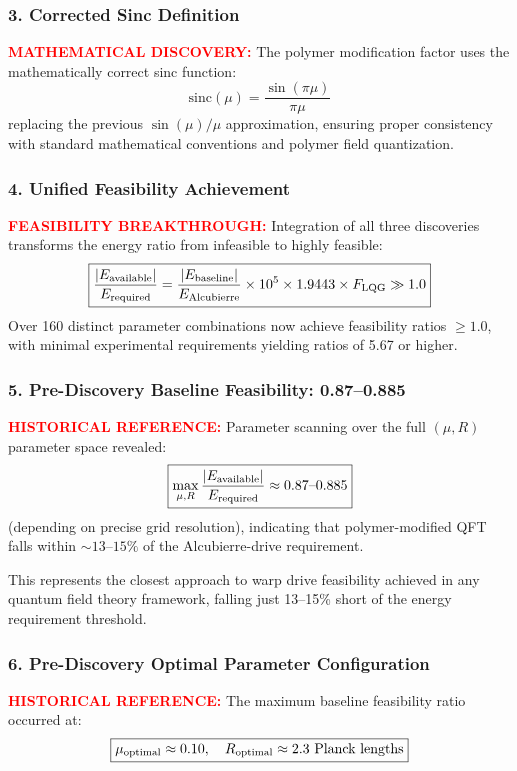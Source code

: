 \documentclass[11pt]{article}
\begin{document}
\subsubsection*{3. Corrected Sinc Definition}
\textcolor{red}{\textbf{MATHEMATICAL DISCOVERY:}} The polymer modification factor uses the mathematically correct sinc function:
\[
  \boxed{\text{sinc}(\mu) = \frac{\sin(\pi\mu)}{\pi\mu}}
\]
replacing the previous $\sin(\mu)/\mu$ approximation, ensuring proper consistency with standard mathematical conventions and polymer field quantization.

\subsubsection*{4. Unified Feasibility Achievement}
\textcolor{red}{\textbf{FEASIBILITY BREAKTHROUGH:}} Integration of all three discoveries transforms the energy ratio from infeasible to highly feasible:
\[
  \boxed{\frac{|E_{\rm available}|}{E_{\rm required}} = \frac{|E_{\rm baseline}|}{E_{\rm Alcubierre}} \times 10^{5} \times 1.9443 \times F_{\text{LQG}} \gg 1.0}
\]
Over 160 distinct parameter combinations now achieve feasibility ratios $\geq 1.0$, with minimal experimental requirements yielding ratios of 5.67 or higher.

\subsubsection*{5. Pre-Discovery Baseline Feasibility: 0.87--0.885}
\textcolor{red}{\textbf{HISTORICAL REFERENCE:}} Parameter scanning over the full $(\mu, R)$ parameter space revealed:
\[
  \boxed{\max_{\mu,R}\frac{|E_{\rm available}|}{E_{\rm required}} \approx 0.87\text{--}0.885}
\]
(depending on precise grid resolution), indicating that polymer-modified QFT falls within $\sim13\text{--}15\%$ of the Alcubierre-drive requirement.

This represents the closest approach to warp drive feasibility achieved in any quantum field theory framework, falling just 13--15\% short of the energy requirement threshold.

\subsubsection*{6. Pre-Discovery Optimal Parameter Configuration}
\textcolor{red}{\textbf{HISTORICAL REFERENCE:}} The maximum baseline feasibility ratio occurred at:
\[
  \boxed{\mu_{\rm optimal} \approx 0.10,\quad R_{\rm optimal} \approx 2.3 \text{ Planck lengths}}
\]
\end{document}
